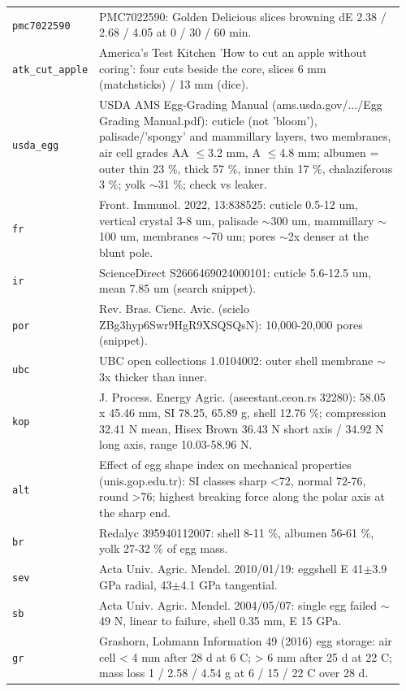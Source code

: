\documentclass[10.5pt,a4paper]{article}
\begin{document}
{\begin{longtable}{@{}p{0.16\linewidth}p{0.8\linewidth}@{}}
\texttt{pmc7022590} & PMC7022590: Golden Delicious slices browning dE 2.38 / 2.68 / 4.05 at 0 / 30 / 60 min. \\
\texttt{atk\_\allowbreak{}cut\_\allowbreak{}apple} & America's Test Kitchen 'How to cut an apple without coring': four cuts beside the core, slices 6 mm (matchsticks) / 13 mm (dice). \\
\texttt{usda\_\allowbreak{}egg} & USDA AMS Egg-Grading Manual (ams.usda.gov/.../Egg Grading Manual.pdf): cuticle (not 'bloom'), palisade/'spongy' and mammillary layers, two membranes, air cell grades AA $\le$3.2 mm, A $\le$4.8 mm; albumen = outer thin 23 \%, thick 57 \%, inner thin 17 \%, chalaziferous 3 \%; yolk $\sim$31 \%; check vs leaker. \\
\texttt{fr} & Front. Immunol. 2022, 13:838525: cuticle 0.5-12 um, vertical crystal 3-8 um, palisade $\sim$300 um, mammillary $\sim$100 um, membranes $\sim$70 um; pores $\sim$2x denser at the blunt pole. \\
\texttt{ir} & ScienceDirect S2666469024000101: cuticle 5.6-12.5 um, mean 7.85 um (search snippet). \\
\texttt{por} & Rev. Bras. Cienc. Avic. (scielo ZBg3hyp6Swr9HgR9XSQSQsN): 10,000-20,000 pores (snippet). \\
\texttt{ubc} & UBC open collections 1.0104002: outer shell membrane $\sim$3x thicker than inner. \\
\texttt{kop} & J. Process. Energy Agric. (aseestant.ceon.rs 32280): 58.05 x 45.46 mm, SI 78.25, 65.89 g, shell 12.76 \%; compression 32.41 N mean, Hisex Brown 36.43 N short axis / 34.92 N long axis, range 10.03-58.96 N. \\
\texttt{alt} & Effect of egg shape index on mechanical properties (unis.gop.edu.tr): SI classes sharp <72, normal 72-76, round >76; highest breaking force along the polar axis at the sharp end. \\
\texttt{br} & Redalyc 395940112007: shell 8-11 \%, albumen 56-61 \%, yolk 27-32 \% of egg mass. \\
\texttt{sev} & Acta Univ. Agric. Mendel. 2010/01/19: eggshell E 41$\pm$3.9 GPa radial, 43$\pm$4.1 GPa tangential. \\
\texttt{sb} & Acta Univ. Agric. Mendel. 2004/05/07: single egg failed $\sim$49 N, linear to failure, shell 0.35 mm, E 15 GPa. \\
\texttt{gr} & Grashorn, Lohmann Information 49 (2016) egg storage: air cell < 4 mm after 28 d at 6 C; > 6 mm after 25 d at 22 C; mass loss 1 / 2.58 / 4.54 g at 6 / 15 / 22 C over 28 d. \\

\end{longtable}}
\end{document}

